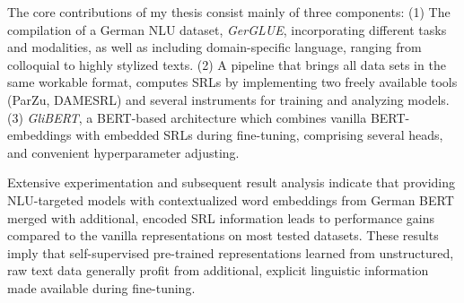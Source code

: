 \label{chap:6_conclusion}



The core contributions of my thesis consist mainly of three components: (1) The compilation
of a German NLU dataset, \emph{GerGLUE}, incorporating different tasks and modalities, as well
as including domain-specific language, ranging from colloquial to highly stylized texts. (2) A
pipeline that brings all data sets in the same workable format, computes SRLs by implementing
two freely available tools (ParZu, DAMESRL) and several instruments for training and analyzing
models. (3) \emph{GliBERT}, a BERT-based architecture which combines vanilla BERT-embeddings
with embedded SRLs during fine-tuning, comprising several heads, and convenient hyperparameter
adjusting.

Extensive experimentation and subsequent result analysis indicate that providing NLU-targeted
models with contextualized word embeddings from German BERT merged with additional, encoded SRL
information leads to performance gains compared to the vanilla representations on most tested
datasets. These results imply that self-supervised pre-trained representations learned from
unstructured, raw text data generally profit from additional, explicit linguistic information
made available during fine-tuning.



